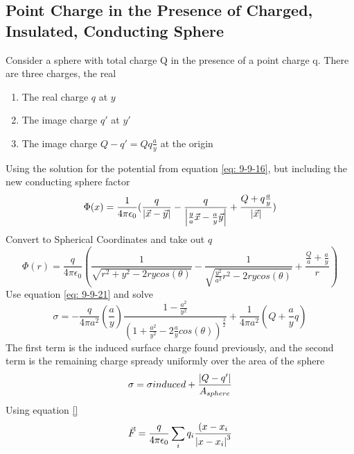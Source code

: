 \documentclass[12pt]{article}
\begin{document}
\subsection{Point Charge in the Presence of Charged, Insulated, Conducting Sphere} \label{sectionCICS}
    Consider a sphere with total charge Q in the presence of a point charge q. 
    \newline There are three charges, the real
    \begin{enumerate}
        \item The real charge $q$ at $y$
        \item The image charge $q'$ at $y'$
        \item The image charge $Q-q' = Q q \frac{a}{y}$ at the origin
    \end{enumerate}
    Using the solution for the potential from equation \ref{eq: 9-9-16}, but including the new conducting sphere factor
    \begin{equation} \label{10-10-1}
        \Phi(x) = \frac{1}{4 \pi \epsilon_0} (\frac{q}{\abs{\vec{x}-\vec{y}}} - \frac{q}{\abs{\frac{y}{a} \vec{x} - \frac{a}{y} \vec{y}}} + \frac{Q + q\frac{a}{y}}{\abs{\vec{x}}})
    \end{equation}
    Convert to Spherical Coordinates and take out $q$
    \begin{equation} \label{10-10-2}
        \Phi(r) = \frac{q}{4 \pi \epsilon_0} (\frac{1}{\sqrt{r^2 + y^2 - 2 r y cos(\theta)}} - \frac{1}{\sqrt{\frac{y^2}{a^2} r^2 - 2 r y cos(\theta)}} + \frac{\frac{Q}{a} + \frac{a}{y}}{r})
    \end{equation}
    Use equation \ref{eq: 9-9-21} and solve
    \begin{equation} \label{eq: 10-10-3}
        \sigma = -\frac{q}{4 \pi a^2} (\frac{a}{y}) \frac{1-\frac{a^2}{y^2}}{(1+\frac{a^2}{y^2}-2\frac{a}{y}cos(\theta))^{\frac{3}{2}}} + \frac{1}{4 \pi a^2}(Q + \frac{a}{y}q)
    \end{equation}
    The first term is the induced surface charge found previously, and the second term is the remaining charge spready uniformly over the area of the sphere
    \begin{equation} \label{eq: 10-10-4}
        \sigma = \sigma{induced} + \frac{\abs{Q-q'}}{A_{sphere}}
    \end{equation}
    Using equation \ref{}
    \begin{gather*}
        \vec{F} = \frac{q}{4 \pi \epsilon_0} \sum_i q_i \frac{(x-x_i}{\abs{x-x_i}^3}
    \end{gather*}
\end{document}
